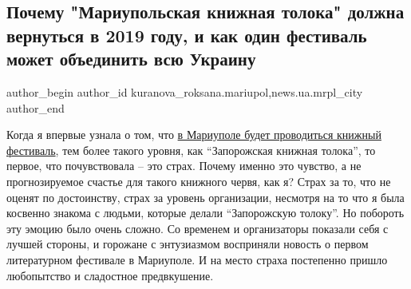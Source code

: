  
 
 
 
 
 
\subsection{Почему "Мариупольская книжная толока" должна вернуться в 2019 году, и как один фестиваль может объединить всю Украину}
\label{sec:18_04_2018.stz.news.ua.mrpl_city.1.knizhna_toloka_vernutsja_2019}
 
\ifcmt
 author_begin
   author_id kuranova_roksana.mariupol,news.ua.mrpl_city
 author_end
\fi

Когда я впервые узнала о том, что
\href{https://mrpl.city/news/view/knizhnaya-toloka-vpervye-priedet-v-mariupol}{в %
Мариуполе будет проводиться книжный фестиваль}, тем более такого уровня, как
\enquote{Запорожская книжная толока}, то первое, что почувствовала – это страх. Почему
именно это чувство, а не прогнозируемое счастье для такого книжного червя, как
я? Страх за то, что не оценят по достоинству, страх за уровень организации,
несмотря на то что я была косвенно знакома с людьми, которые делали
\enquote{Запорожскую толоку}. Но побороть эту эмоцию было очень сложно. Со временем и
организаторы показали себя с лучшей стороны, и горожане с энтузиазмом
восприняли новость о первом литературном фестивале в Мариуполе. И на место
страха постепенно пришло любопытство и сладостное предвкушение.


